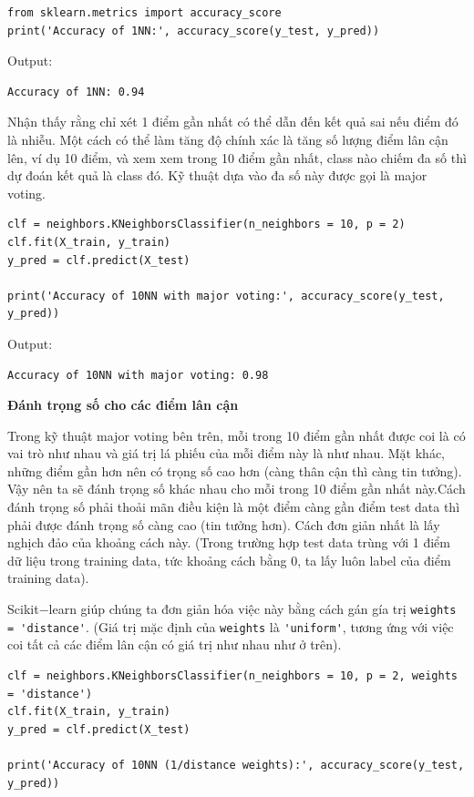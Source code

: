 \documentclass{article}
\begin{document}
\begin{lstlisting}
from sklearn.metrics import accuracy_score
print('Accuracy of 1NN:', accuracy_score(y_test, y_pred))
\end{lstlisting}

Output:

\begin{lstlisting}
Accuracy of 1NN: 0.94
\end{lstlisting}

Nhận thấy rằng chỉ xét 1 điểm gần nhất có thể dẫn đến kết quả sai nếu điểm đó là nhiễu. Một cách có thể làm tăng độ chính xác là tăng số lượng điểm lân cận lên, ví dụ 10 điểm, và xem xem trong 10 điểm gần nhất, class nào chiếm đa số thì dự đoán kết quả là class đó. Kỹ thuật dựa vào đa số này được gọi là major voting.

\begin{lstlisting}
clf = neighbors.KNeighborsClassifier(n_neighbors = 10, p = 2)
clf.fit(X_train, y_train)
y_pred = clf.predict(X_test)

print('Accuracy of 10NN with major voting:', accuracy_score(y_test, y_pred))
\end{lstlisting}

Output:

\begin{lstlisting}
Accuracy of 10NN with major voting: 0.98
\end{lstlisting}

\textbf{Đánh trọng số cho các điểm lân cận}

Trong kỹ thuật major voting bên trên, mỗi trong 10 điểm gần nhất được coi là có vai trò như nhau và giá trị lá phiếu của mỗi điểm này là như nhau. Mặt khác, những điểm gần hơn nên có trọng số cao hơn (càng thân cận thì càng tin tưởng). Vậy nên ta sẽ đánh trọng số khác nhau cho mỗi trong 10 điểm gần nhất này.Cách đánh trọng số phải thoải mãn điều kiện là một điểm càng gần điểm test data thì phải được đánh trọng số càng cao (tin tưởng hơn). Cách đơn giản nhất là lấy nghịch đảo của khoảng cách này. (Trong trường hợp test data trùng với 1 điểm dữ liệu trong training data, tức khoảng cách bằng 0, ta lấy luôn label của điểm training data).

Scikit$-$learn giúp chúng ta đơn giản hóa việc này bằng cách gán gía trị \lstinline{weights = 'distance'}. (Giá trị mặc định của \lstinline{weights} là \lstinline{'uniform'}, tương ứng với việc coi tất cả các điểm lân cận có giá trị như nhau như ở trên).

\begin{lstlisting}
clf = neighbors.KNeighborsClassifier(n_neighbors = 10, p = 2, weights = 'distance')
clf.fit(X_train, y_train)
y_pred = clf.predict(X_test)

print('Accuracy of 10NN (1/distance weights):', accuracy_score(y_test, y_pred))
\end{lstlisting}
\end{document}

